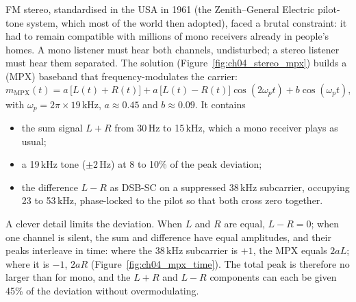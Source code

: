 FM stereo, standardised in the USA in 1961 (the Zenith--General Electric pilot-tone system, which most of
the world then adopted), faced a brutal constraint: it had to remain compatible with millions of mono
receivers already in people's homes. A mono listener must hear both channels, undisturbed; a stereo
listener must hear them separated. The solution (Figure~\ref{fig:ch04_stereo_mpx}) builds a
 (MPX) baseband that frequency-modulates the carrier:
\begin{equation}
m_{\text{MPX}}(t)=a\,\big[L(t)+R(t)\big]+a\,\big[L(t)-R(t)\big]\cos(2\omega_pt)+b\cos(\omega_pt),
\label{eq:ch04:mpx}
\end{equation}
with $\omega_p=2\pi\times19$\,kHz, $a\approx0.45$ and $b\approx0.09$. It contains
\begin{itemize}
\item the sum signal $L+R$ from 30\,Hz to 15\,kHz, which a mono receiver plays as usual;
\item a 19\,kHz  tone ($\pm2$\,Hz) at 8 to 10\% of the peak deviation;
\item the difference $L-R$ as DSB-SC on a suppressed 38\,kHz subcarrier, occupying 23 to 53\,kHz,
phase-locked to the pilot so that both cross zero together.
\end{itemize}


A clever detail limits the deviation. When $L$ and $R$ are equal, $L-R=0$; when one channel is silent, the
sum and difference have equal amplitudes, and their peaks interleave in time: where the 38\,kHz subcarrier
is $+1$, the MPX equals $2aL$; where it is $-1$, $2aR$ (Figure~\ref{fig:ch04_mpx_time}). The total peak is
therefore no larger than for mono, and the $L+R$ and $L-R$ components can each be given 45\% of the
deviation without overmodulating.


